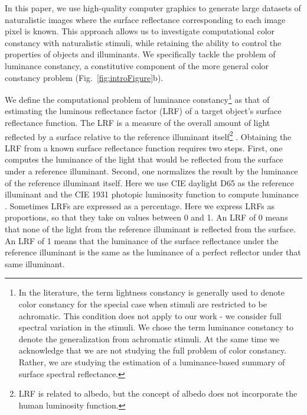 \documentclass{jov}
\begin{document}
In this paper, we use high-quality computer graphics to generate large datasets of naturalistic images where the surface reflectance corresponding to each image pixel is known. 
This approach allows us to investigate computational color constancy with naturalistic stimuli, while retaining the ability to control the properties of objects and illuminants. We specifically tackle the problem of luminance constancy, a constitutive component of the more general color constancy problem (Fig.~\ref{fig:introFigure}b). 

We define the computational problem of luminance constancy\footnote{In the literature, the term lightness constancy is generally used to denote color constancy for the special case when stimuli are restricted to be achromatic. This condition does not apply to our work - we consider full spectral variation in the stimuli. We chose the term luminance constancy to denote the generalization from achromatic stimuli. At the same time we acknowledge that we are not studying the full problem of color constancy. Rather, we are studying the estimation of a luminance-based summary of surface spectral reflectance.} as that of estimating the luminous reflectance factor (LRF) of a target object's surface reflectance function.
The LRF is a measure of the overall amount of light reflected by a surface relative to the reference illuminant itself\footnote{LRF is related to albedo, but the concept of albedo does not incorporate the human luminosity function.} \cite{astm1121477}.
Obtaining the LRF from a known surface reflectance function requires two steps.
First, one computes the luminance of the light that would be reflected from the surface under a reference illuminant.
Second, one normalizes the result by the luminance of the reference illuminant itself.
Here we use CIE daylight D65 as the reference illuminant and the CIE 1931 photopic luminosity function to compute luminance \cite{CIE86}.
Sometimes LRFs are expressed as a percentage.
Here we express LRFs as proportions, so that they take on values between 0 and 1. 
An LRF of 0 means that none of the light from the reference illuminant is reflected from the surface. 
An LRF of 1 means that the luminance of the surface reflectance under the reference illuminant is the same as the luminance of a perfect reflector under that same illuminant.
\end{document}
